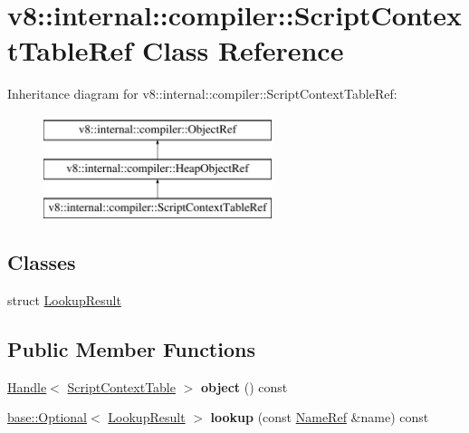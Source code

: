 \hypertarget{classv8_1_1internal_1_1compiler_1_1ScriptContextTableRef}{}\section{v8\+:\+:internal\+:\+:compiler\+:\+:Script\+Context\+Table\+Ref Class Reference}
\label{classv8_1_1internal_1_1compiler_1_1ScriptContextTableRef}
Inheritance diagram for v8\+:\+:internal\+:\+:compiler\+:\+:Script\+Context\+Table\+Ref\+:\begin{figure}[H]
\begin{center}
\leavevmode
\includegraphics[height=3.000000cm]{classv8_1_1internal_1_1compiler_1_1ScriptContextTableRef}
\end{center}
\end{figure}
\subsection*{Classes}
\begin{DoxyCompactItemize}
\item 
struct \mbox{\hyperlink{structv8_1_1internal_1_1compiler_1_1ScriptContextTableRef_1_1LookupResult}{Lookup\+Result}}
\end{DoxyCompactItemize}
\subsection*{Public Member Functions}
\begin{DoxyCompactItemize}
\item 
\mbox{\label{classv8_1_1internal_1_1compiler_1_1ScriptContextTableRef_a456201e271df7978ec25258bdb276bc3}} 
\mbox{\hyperlink{classv8_1_1internal_1_1Handle}{Handle}}$<$ \mbox{\hyperlink{classv8_1_1internal_1_1ScriptContextTable}{Script\+Context\+Table}} $>$ {\bfseries object} () const
\item 
\mbox{\label{classv8_1_1internal_1_1compiler_1_1ScriptContextTableRef_aec2aae1a76a3b6b30bb35c1fa5e76b3d}} 
\mbox{\hyperlink{classv8_1_1base_1_1Optional}{base\+::\+Optional}}$<$ \mbox{\hyperlink{structv8_1_1internal_1_1compiler_1_1ScriptContextTableRef_1_1LookupResult}{Lookup\+Result}} $>$ {\bfseries lookup} (const \mbox{\hyperlink{classv8_1_1internal_1_1compiler_1_1NameRef}{Name\+Ref}} \&name) const
\end{DoxyCompactItemize}
